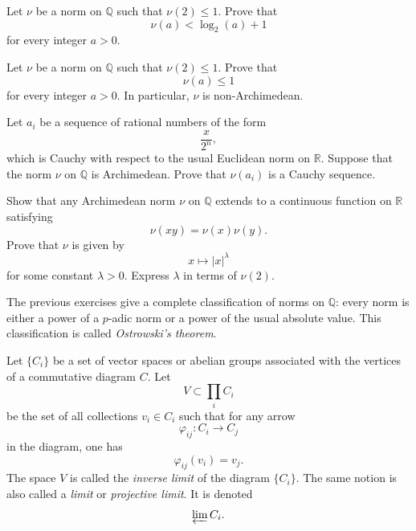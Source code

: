 \begin{exercise}
\label{exercise-norm-bound-by-log}
Let $\nu$ be a norm on $\mathbb Q$ such
that $\nu(2)\leq 1$. Prove that
$$
\nu(a)<\log_2(a)+1
$$
for every integer $a>0$.
\end{exercise}

\begin{exercise}
\label{exercise-norm-two-less-than-one}
Let $\nu$ be a norm on $\mathbb Q$ such
that $\nu(2)\leq 1$. Prove that
$$
\nu(a)\leq 1
$$
for every integer $a>0$. In particular,
$\nu$ is non-Archimedean.
\end{exercise}

\begin{exercise}
\label{exercise-archimedean-cauchy-sequence}
Let $a_i$ be a sequence of rational
numbers of the form
$$
\frac{x}{2^n},
$$
which is Cauchy with respect to the
usual Euclidean norm on $\mathbb R$.
Suppose that the norm $\nu$ on
$\mathbb Q$ is Archimedean. Prove that
$\nu(a_i)$ is a Cauchy sequence.
\end{exercise}

\begin{exercise}
\label{exercise-archimedean-norm-extension}
Show that any Archimedean norm $\nu$ on
$\mathbb Q$ extends to a continuous
function on $\mathbb R$ satisfying
$$
\nu(xy)=\nu(x)\nu(y).
$$
Prove that $\nu$ is given by
$$
x \mapsto |x|^\lambda
$$
for some constant $\lambda>0$. Express
$\lambda$ in terms of $\nu(2)$.
\end{exercise}

\begin{remark}
\label{remark-ostrowski-theorem}
The previous exercises give a complete
classification of norms on
$\mathbb Q$: every norm is either a
power of a $p$-adic norm or a power of
the usual absolute value. This
classification is called
{\it Ostrowski's theorem}.
\end{remark}

\begin{definition}
\label{definition-inverse-limit}
Let $\{C_i\}$ be a set of vector spaces
or abelian groups associated with the
vertices of a commutative diagram $C$.
Let
$$
V \subset \prod_i C_i
$$
be the set of all collections
$v_i \in C_i$ such that for any arrow
$$
\varphi_{ij}:C_i \to C_j
$$
in the diagram, one has
$$
\varphi_{ij}(v_i)=v_j.
$$
The space $V$ is called the
{\it inverse limit} of the diagram
$\{C_i\}$. The same notion is also
called a {\it limit} or
{\it projective limit}. It is denoted
$$
\varprojlim C_i.
$$
\end{definition}

